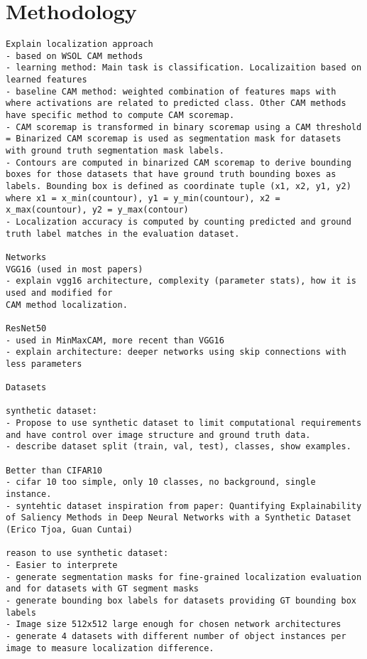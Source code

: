 \chapter{Methodology}

\begin{verbatim}
Explain localization approach
- based on WSOL CAM methods
- learning method: Main task is classification. Localizaition based on learned features
- baseline CAM method: weighted combination of features maps with where activations are related to predicted class. Other CAM methods have specific method to compute CAM scoremap.
- CAM scoremap is transformed in binary scoremap using a CAM threshold
= Binarized CAM scoremap is used as segmentation mask for datasets with ground truth segmentation mask labels.
- Contours are computed in binarized CAM scoremap to derive bounding boxes for those datasets that have ground truth bounding boxes as labels. Bounding box is defined as coordinate tuple (x1, x2, y1, y2) where x1 = x_min(countour), y1 = y_min(countour), x2 = x_max(countour), y2 = y_max(contour)
- Localization accuracy is computed by counting predicted and ground truth label matches in the evaluation dataset.

Networks
VGG16 (used in most papers)
- explain vgg16 architecture, complexity (parameter stats), how it is used and modified for 
CAM method localization.

ResNet50 
- used in MinMaxCAM, more recent than VGG16
- explain architecture: deeper networks using skip connections with less parameters

Datasets

synthetic dataset:
- Propose to use synthetic dataset to limit computational requirements and have control over image structure and ground truth data.
- describe dataset split (train, val, test), classes, show examples.

Better than CIFAR10
- cifar 10 too simple, only 10 classes, no background, single instance.
- syntehtic dataset inspiration from paper: Quantifying Explainability of Saliency Methods in Deep Neural Networks with a Synthetic Dataset (Erico Tjoa, Guan Cuntai)

reason to use synthetic dataset:
- Easier to interprete
- generate segmentation masks for fine-grained localization evaluation and for datasets with GT segment masks
- generate bounding box labels for datasets providing GT bounding box labels
- Image size 512x512 large enough for chosen network architectures
- generate 4 datasets with different number of object instances per image to measure localization difference.


\end{verbatim}
